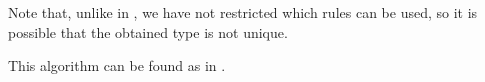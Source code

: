 \begin{comments}
  \item Note that, unlike in , we have not restricted which rules can be used, so it is possible that the obtained type is not unique.

  \item This algorithm can be found as  in \cite{notebook:code}.
\end{comments}

